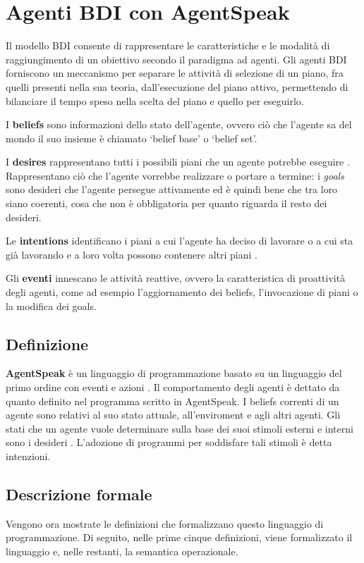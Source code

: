\section{Agenti BDI con AgentSpeak}\label{sctn:AgentiBDI}
Il modello BDI consente di rappresentare le caratteristiche e le modalità di raggiungimento di un obiettivo secondo il paradigma ad agenti. Gli agenti BDI forniscono un meccanismo per separare le attività di selezione di un piano, fra quelli presenti nella sua teoria, dall'esecuzione del piano attivo, permettendo di bilanciare il tempo speso nella scelta del piano e quello per eseguirlo.

I \textbf{beliefs} sono informazioni dello stato dell'agente, ovvero ciò che l'agente sa del mondo \cite{JasonAgentSpeak} il suo insieme è chiamato `belief base' o `belief set'.

I \textbf{desires} rappresentano tutti i possibili piani che un agente potrebbe eseguire \cite{JasonAgentSpeak}. Rappresentano ciò che l'agente vorrebbe realizzare o portare a termine: i \textit{goals} sono desideri che l'agente persegue attivamente ed è quindi bene che tra loro siano coerenti, cosa che non è obbligatoria per quanto riguarda il resto dei desideri.

Le \textbf{intentions} identificano i piani a cui l'agente ha deciso di lavorare o a cui sta già lavorando e a loro volta possono contenere altri piani \cite{JasonAgentSpeak}.

Gli \textbf{eventi} innescano le attività reattive, ovvero la caratteristica di proattività degli agenti, come ad esempio l'aggiornamento dei beliefs, l'invocazione di piani o la modifica dei goals.

\subsection{Definizione}
\textbf{AgentSpeak} è un linguaggio di programmazione basato su un linguaggio del primo ordine con eventi e azioni \cite{AgentSpeak}. Il comportamento degli agenti è dettato da quanto definito nel programma scritto in AgentSpeak.
I beliefs correnti di un agente sono relativi al suo stato attuale, all'enviroment e agli altri agenti. Gli stati che un agente vuole determinare sulla base dei suoi stimoli esterni e interni sono i desideri \cite{AgentSpeak}. L'adozione di programmi per soddisfare tali stimoli è detta intenzioni.

\subsection{Descrizione formale}
Vengono ora mostrate le definizioni che formalizzano questo linguaggio di programmazione.
Di seguito, nelle prime cinque definizioni, viene formalizzato il linguaggio e, nelle restanti, la semantica operazionale.

